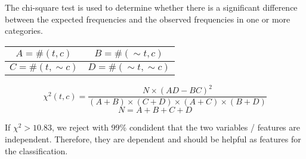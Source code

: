 \begin{multicols*}{2}
\noindent The chi-square test is used to determine whether there is a significant difference between the expected frequencies and the observed frequencies in one or more categories. 

\begin{center}
\begin{tabular}{ |c|c| } 
    \hline
    $A = \#(t,c)$ & $B = \#(\sim t,c)$ \\
    \hline 
    $C = \#(t,\sim c)$ & $D = \#(\sim t,\sim c)$ \\
    \hline
\end{tabular}
\end{center}

$$\chi^2(t,c) = \frac{N\times (AD - BC)^2}{(A+B) \times (C+D) \times (A+C) \times (B+D)}$$
$$N=A+B+C+D$$

\noindent If $\chi^2 > 10.83$, we reject with 99\% condident that the two variables / features are independent. Therefore, they are dependent and should be helpful as features for the classification.

\end{multicols*}
